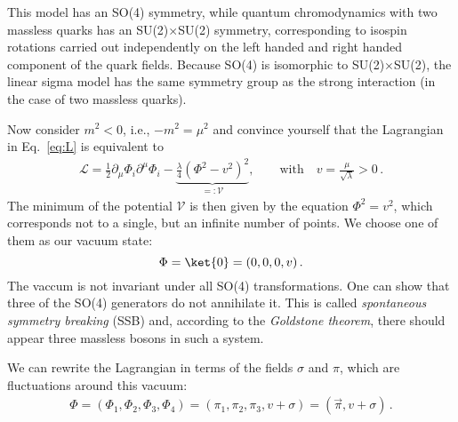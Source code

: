 \documentclass[11pt]{latex/exercise}
\begin{document}
This model has an SO(4) symmetry, while quantum chromodynamics with two massless quarks has an SU(2)$\times$SU(2) symmetry, corresponding to isospin rotations carried out independently on the left handed and right handed component of the quark fields. Because SO(4) is isomorphic to SU(2)$\times$SU(2), the linear sigma model has the same symmetry group as the strong interaction (in the case of two massless quarks).

Now consider $m^2<0$, i.e., $-m^2=\mu^2$ and convince yourself that the Lagrangian in Eq.~\eqref{eq:L} is equivalent to
\begin{eqnarray}
    \mathcal{L} = \frac12 \partial_{\mu} \Phi_i \partial^{\mu} \Phi_i
    - \underbrace{\frac{\lambda}{4} {\left( \Phi^2 - v^2 \right)}^2}_{\displaystyle =: \mathcal V},
    \qquad \text{with} \quad v=\frac{\mu}{\sqrt{\lambda}}>0 \,.
    \label{eq:Lwithv}
\end{eqnarray}
The minimum of the potential $\mathcal V$ is then given by the equation $\Phi^2 = v^2$,
which corresponds not to a single, but an infinite number of points.
We choose one of them as our vacuum state:
\begin{equation}
    \Phi
    =\ket{0}
    = (0,0,0,v)\,.
    \label{eq:vacuum}
\end{equation}
The vaccum is not invariant under all SO(4) transformations. One can show that three of the SO(4) generators do not annihilate it. This is called \emph{spontaneous symmetry breaking} (SSB) and, according to the \emph{Goldstone theorem}, there should appear three massless bosons in such a system.

We can rewrite the Lagrangian in terms of the fields $\sigma$ and $\pi$, which are fluctuations around this vacuum:
\begin{eqnarray}
    \Phi = (\Phi_1, \Phi_2, \Phi_3, \Phi_4)
    = (\pi_1, \pi_2, \pi_3,v + \sigma) = (\vec{\pi}, v+\sigma)\,.
\end{eqnarray}
\end{document}
